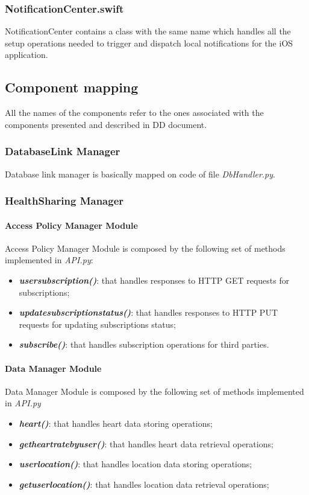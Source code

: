 \documentclass{article}
\begin{document}
\subsubsection{NotificationCenter.swift}
NotificationCenter contains a class with the same name which handles all the setup operations needed to trigger and dispatch local notifications for the iOS application.

\subsection{Component mapping}
All the names of the components refer to the ones associated with the components presented and described in DD document.

\subsubsection{DatabaseLink Manager}
Database link manager is basically mapped on code of file \textit{DbHandler.py}.
\subsubsection{HealthSharing Manager}
\paragraph{Access Policy Manager Module}
Access Policy Manager Module is composed by the following set of methods implemented in \textit{API.py}:
\begin{itemize}
	\item \textit{\textbf{user\textunderscore subscription()}}: that handles responses to HTTP GET requests for subscriptions;
	\item \textit{\textbf{update\textunderscore subscription\textunderscore status()}}: that handles responses to HTTP PUT requests for updating subscriptions status;
	\item \textit{\textbf{subscribe()}}: that handles subscription operations for third parties.
\end{itemize}

\paragraph{Data Manager Module}
Data Manager Module is composed by the following set of methods implemented in \textit{API.py}
\begin{itemize}
	\item \textit{\textbf{heart()}}: that handles heart data storing operations;
	\item \textit{\textbf{get\textunderscore heart\textunderscore rate\textunderscore by\textunderscore user()}}: that handles heart data retrieval operations;
	\item \textit{\textbf{user\textunderscore location()}}: that handles location data storing operations;
	\item \textit{\textbf{get\textunderscore user\textunderscore location()}}: that handles location data retrieval operations;
\end{itemize}
\end{document}
